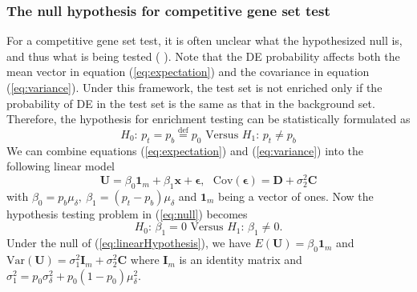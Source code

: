 \documentclass[useAMS,usenatbib, galley]{biom}
\begin{document}
	\subsubsection{The null hypothesis for competitive gene set test}\label{subsubsection:nullhypothesis}
	For a competitive gene set test, it is often unclear what the hypothesized null is, and thus what is being tested (\cite{barry2008statistical}  \citealp{wu2012camera}). Note that the DE probability affects both the mean vector in equation (\ref{eq:expectation}) and the covariance in equation (\ref{eq:variance}). Under this framework, the test set is not enriched only if the probability of DE in the test set is the same as that in the background set. Therefore, the hypothesis for enrichment testing can be statistically formulated as
	\begin{equation}\label{eq:null}
	H_0\text{: }  p_t = p_b \stackrel{\text{def}}{=}p_0  \text{ Versus } H_1 \text{: } p_t \neq p_b
	\end{equation}
	We can combine equations (\ref{eq:expectation}) and (\ref{eq:variance}) into the following linear model
	\begin{equation}\label{eq:linearModel}
	\bm U = \beta_0\bm 1_m + \beta_1\bm x + \bm \epsilon, \text{~~Cov}(\bm \epsilon) =  \bm D  + \sigma_2^2\bm C
	\end{equation} 
	with $ \beta_0 = p_b\mu_{\delta}, ~\beta_1 = (p_t-p_b)\mu_{\delta}$ and $\bm 1_m$ being a vector of ones. Now the hypothesis testing problem in (\ref{eq:null}) becomes 
	\begin{equation}\label{eq:linearHypothesis}
	H_0\text{: }  \beta_1 = 0   \text{ Versus } H_1 \text{: } \beta_1 \neq 0.
	\end{equation}
	Under the null of (\ref{eq:linearHypothesis}), we have $E(\bm U) = \beta_0\bm 1_m$ and $\text{Var}(\bm U) = \sigma^2_1\bm I_m + \sigma_2^2 \bm C$ where $\bm I_m$ is an identity matrix and $\sigma_1^2 = p_0\sigma^2_{\delta}+ p_0(1-p_0)\mu^2_{\delta}$.
	
\end{document}

